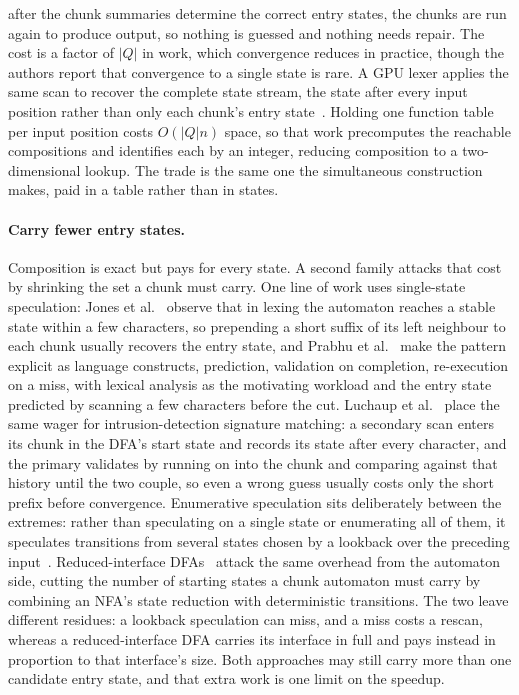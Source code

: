 \documentclass[11pt,a4paper]{article}
\theoremstyle{definition}
\theoremstyle{plain}
\begin{document}
after the chunk summaries determine the correct entry states, the chunks are run again to produce output, so nothing
is guessed and nothing needs repair. The cost is a factor of $|Q|$ in work, which convergence reduces in practice,
though the authors report that convergence to a single state is rare. A GPU lexer applies the same scan to recover the
complete state stream, the state after every input position rather than only each chunk's entry
state~\cite{voetter2021gpu}. Holding one function table per input position costs $O(|Q|n)$ space, so that work
precomputes the reachable compositions and identifies each by an integer, reducing composition to a two-dimensional
lookup. The trade is the same one the simultaneous construction makes, paid in a table rather than in states.

\paragraph{Carry fewer entry states.} Composition is exact but pays for every state. A second family attacks that cost
by shrinking the set a chunk must carry. One line of work uses single-state speculation: Jones et
al.~\cite{jones2009browser} observe that in lexing the automaton reaches a stable state within a few characters, so
prepending a short suffix of its left neighbour to each chunk usually recovers the entry state, and Prabhu et
al.~\cite{prabhu2010speculative} make the pattern explicit as language constructs, prediction, validation on
completion, re-execution on a miss, with lexical analysis as the motivating workload and the entry state predicted by
scanning a few characters before the cut. Luchaup et al.~\cite{luchaup2009speculation} place the same wager for
intrusion-detection signature matching: a secondary scan enters its chunk in the DFA's start state and records its
state after every character, and the primary validates by running on into the chunk and comparing against that history
until the two couple, so even a wrong guess usually costs only the short prefix before convergence. Enumerative
speculation sits deliberately between the extremes: rather than speculating on a single state or enumerating all of
them, it speculates transitions from several states chosen by a lookback over the preceding
input~\cite{jiang2017enumerative}. Reduced-interface DFAs~\cite{borsotti2025ridfa} attack the same overhead from the
automaton side, cutting the number of starting states a chunk automaton must carry by combining an NFA's state
reduction with deterministic transitions. The two leave different residues: a lookback speculation can miss, and a
miss costs a rescan, whereas a reduced-interface DFA carries its interface in full and pays instead in proportion to
that interface's size. Both approaches may still carry more than one candidate entry state, and that extra work is one
limit on the speedup.
\end{document}
